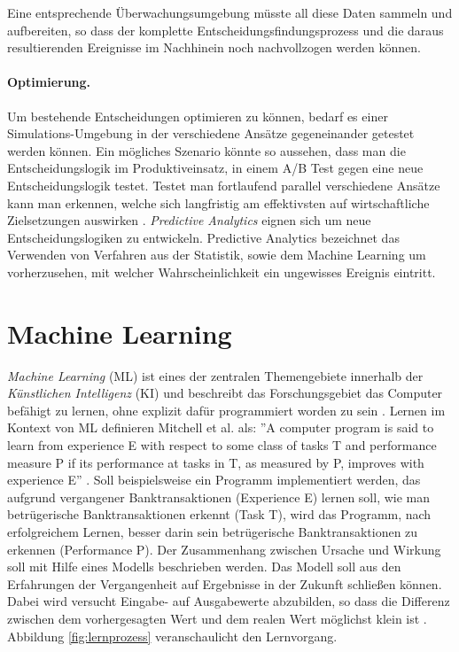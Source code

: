 Eine entsprechende Überwachungsumgebung müsste all diese Daten sammeln und aufbereiten, so dass der komplette Entscheidungsfindungsprozess und die daraus resultierenden Ereignisse im Nachhinein noch nachvollzogen werden können.

\paragraph{Optimierung.} Um bestehende Entscheidungen optimieren zu können, bedarf es einer Simulations-Umgebung in der verschiedene Ansätze gegeneinander getestet werden können. Ein mögliches Szenario könnte so aussehen, dass man die Entscheidungslogik im Produktiveinsatz, in einem A/B Test gegen eine neue Entscheidungslogik testet. Testet man fortlaufend parallel verschiedene Ansätze kann man erkennen, welche sich langfristig am effektivsten auf wirtschaftliche Zielsetzungen auswirken \cite[vgl. S. 173]{JT11}. \emph{Predictive Analytics} eignen sich um neue Entscheidungslogiken zu entwickeln. Predictive Analytics bezeichnet \cite[vgl. S. 5]{BG15} das Verwenden von Verfahren aus der Statistik, sowie dem Machine Learning um vorherzusehen, mit welcher Wahrscheinlichkeit ein ungewisses Ereignis eintritt.   
  
\section{Machine Learning}
\label{sec:Machine_Learning2}

\emph{Machine Learning} (ML) ist eines der zentralen Themengebiete innerhalb der  \emph{Künstlichen Intelligenz} (KI) \cite[vgl. S. 2082]{JW12} und beschreibt das Forschungsgebiet das Computer befähigt zu lernen, ohne explizit dafür programmiert worden zu sein \cite[vgl. S. 1]{AM14}. Lernen im Kontext von ML definieren Mitchell et al. als: ''A computer program is said to learn from experience E with respect to some class of tasks T and performance measure P if its performance at tasks in T, as measured by P, improves with experience E'' \cite{MT97}. Soll beispielsweise ein Programm implementiert werden, das aufgrund vergangener Banktransaktionen (Experience E) lernen soll, wie man betrügerische Banktransaktionen erkennt (Task T), wird das Programm, nach erfolgreichem Lernen, besser darin sein betrügerische Banktransaktionen zu erkennen (Performance P). Der Zusammenhang zwischen Ursache und Wirkung soll mit Hilfe eines Modells beschrieben werden. Das Modell soll aus den Erfahrungen der Vergangenheit auf Ergebnisse in der Zukunft schließen können. Dabei wird versucht Eingabe- auf Ausgabewerte abzubilden, so dass die Differenz zwischen dem vorhergesagten Wert und dem realen Wert möglichst klein ist \cite[vgl. S. 68]{EM17}. Abbildung \ref{fig:lernprozess} veranschaulicht den Lernvorgang.   

